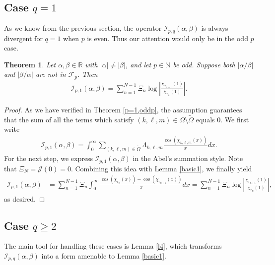 \documentclass[12pt, reqno]{amsart}
\theoremstyle{plain}
\newtheorem{theorem}{Theorem}[section]
\theoremstyle{definition}
\begin{document}
\subsection{Case $q=1$}

As we know from the previous section, the operator  $\mathcal{I}_{p, q}(\alpha, \beta)$ is always divergent for $q=1$ when $p$ is even. Thus our attention would only be in the odd $p$ case.

\begin{theorem}\label{compuq=1}
    Let $\alpha, \beta\in\mathbb{R}$ with $|\alpha|\ne|\beta|$, and let $p\in\mathbb{N}$ be odd. Suppose both $|\alpha/ \beta|$ and $|\beta/\alpha|$ are not in $\mathcal{F}_p$. Then 
    \begin{align*}
        \mathcal{I}_{p, 1}(\alpha, \beta)=\sum_{n=1}^{N-1}\Xi_n\log\left|\frac{\chi_{r_{n+1}}(1)}{\chi_{r_{n}}(1)}\right|.
    \end{align*}
\end{theorem}
\begin{proof}
    As we have verified in Theorem \ref{p=1,oddp}, the assumption guarantees that the sum of all the terms which satisfy $(k,\ell ,m)\in\Omega\setminus\tilde{\Omega}$ equals $0$. We first write
    \begin{align*}
        \mathcal{I}_{p, 1}(\alpha, \beta)=\int_0^{\infty}\sum_{(k, \ell, m)\in\tilde{\Omega}}\Lambda_{k, \ell, m}\frac{\cos (\chi_{k, \ell, m}(x))}{x}dx.
    \end{align*}
    For the next step, we express $\mathcal{I}_{p, 1}(\alpha, \beta)$ in the Abel's summation style. Note that $\Xi_N=\mathcal{J}(0)=0$. Combining this idea with Lemma \ref{basic1}, we finally yield
    \begin{align*}
        \mathcal{I}_{p, 1}(\alpha, \beta) &=\sum_{n=1}^{N-1}\Xi_n\int_0^{\infty}\frac{\cos(\chi_{r_n}(x))-\cos(\chi_{r_{n+1}}(x))}{x}dx=\sum_{n=1}^{N-1}\Xi_n\log\left|\frac{\chi_{r_{n+1}}(1)}{\chi_{r_{n}}(1)}\right|,
    \end{align*}
    as desired.
\end{proof}


\subsection{Case $q\ge 2$}

The main tool for handling these cases is Lemma \ref{l4}, which transforms $\mathcal{I}_{p, q}(\alpha, \beta)$ into a form amenable to Lemma \ref{basic1}.
\end{document}
